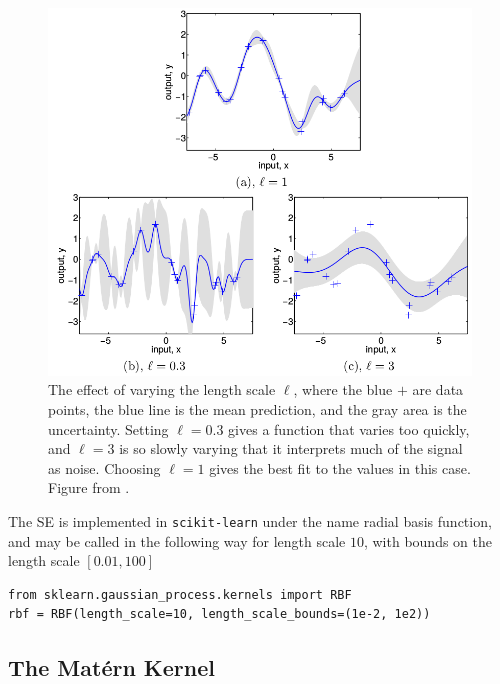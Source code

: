 \documentclass[twoside,english]{uiofysmaster}
\begin{document}
\begin{figure}
\centering
\includegraphics[scale=0.4]{rasmussen_varying_ell.png}
\caption{The effect of varying the length scale $\ell$, where the blue $+$ are data points, the blue line is the mean prediction, and the gray area is the uncertainty. Setting $\ell = 0.3$ gives a function that varies too quickly, and $\ell = 3$ is so slowly varying that it interprets much of the signal as noise. Choosing $\ell =1 $ gives the best fit to the values in this case. Figure from \cite{rasmussen2006gaussian}.}
\end{figure}

The SE is implemented in \verb|scikit-learn| under the name radial basis function, and may be called in the following way for length scale $10$, with bounds on the length scale $[0.01, 100]$
\begin{lstlisting}
from sklearn.gaussian_process.kernels import RBF
rbf = RBF(length_scale=10, length_scale_bounds=(1e-2, 1e2))
\end{lstlisting}



\subsection{The Mat\'{e}rn Kernel}
\end{document}
